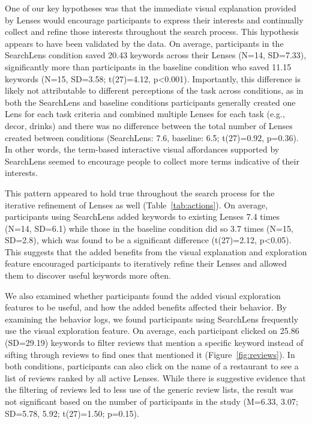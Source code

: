 \documentclass{sigchi}
\begin{document}
One of our key hypotheses was that the immediate visual explanation provided by Lenses would encourage participants to express their interests and continually collect and refine those interests throughout the search process. This hypothesis appears to have been validated by the data. On average, participants in the SearchLens condition saved 20.43 keywords across their Lenses (N=14, SD=7.33), significantly more than participants in the baseline condition who saved 11.15 keywords (N=15, SD=3.58; t(27)=4.12, p<0.001). Importantly, this difference is likely not attributable to different perceptions of the task across conditions, as in both the SearchLens and baseline conditions participants generally created one Lens for each task criteria and combined multiple Lenses for each task (e.g., decor, drinks) and there was no difference between the total number of Lenses created between conditions (SearchLens: 7.6, baseline: 6.5; t(27)=0.92, p=0.36). In other words, the term-based interactive visual affordances supported by SearchLens seemed to encourage people to collect more terms indicative of their interests.

This pattern appeared to hold true throughout the search process for the iterative refinement of Lenses as well (Table~\ref{tab:actions}). On average, participants using SearchLens added keywords to existing Lenses 7.4 times (N=14, SD=6.1) while those in the baseline condition did so 3.7 times (N=15, SD=2.8), which was found to be a significant difference (t(27)=2.12, p<0.05). This suggests that the added benefits from the visual explanation and exploration feature encouraged participants to iteratively refine their Lenses and allowed them to discover useful keywords more often.

We also examined whether participants found the added visual exploration features to be useful, and how the added benefits affected their behavior. By examining the behavior logs, we found participants using SearchLens frequently use the visual exploration feature. On average, each participant clicked on 25.86 (SD=29.19) keywords to filter reviews that mention a specific keyword instead of sifting through reviews to find ones that mentioned it (Figure~\ref{fig:reviews}). In both conditions, participants can also click on the name of a restaurant to see a list of reviews ranked by all active Lenses. While there is suggestive evidence that the filtering of reviews led to less use of the generic review lists, the result was not significant based on the number of participants in the study (M=6.33, 3.07; SD=5.78, 5.92; t(27)=1.50; p=0.15).
\end{document}
